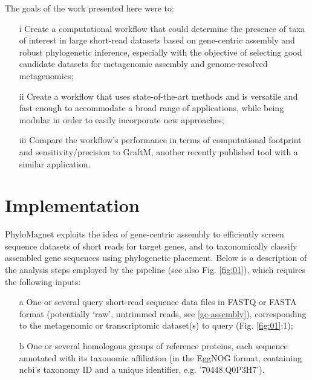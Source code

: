 \documentclass[a4paper]{article}
\begin{document}
The goals of the work presented here were to: 
\begin{enumerate}
\item[i] Create a computational workflow that could determine the presence of taxa of interest in large short-read datasets based on gene-centric assembly and robust phylogenetic inference, especially with the objective of selecting good candidate datasets for metagenomic assembly and genome-resolved metagenomics;
\item[ii] Create a workflow that uses state-of-the-art methods and is versatile and fast enough to accommodate a broad range of applications, while being modular in order to easily incorporate new approaches;
\item[iii] Compare the workflow’s performance in terms of computational footprint and sensitivity/precision to GraftM, another recently published tool with a similar application.
\end{enumerate}


\section{Implementation}\label{implementation}
PhyloMagnet exploits the idea of gene-centric assembly \citep{Huson2017} to efficiently screen sequence datasets  of short reads for target genes, and to taxonomically classify assembled gene sequences using phylogenetic placement. Below is a description of the analysis steps employed by the pipeline (see also Fig. \ref{fig:01}), which requires the following inputs: 
\begin{enumerate}

\item[a] One or several query short-read sequence data files in FASTQ or FASTA format (potentially ‘raw’, untrimmed reads, see \ref{gc-assembly}), corresponding to the metagenomic or transcriptomic dataset(s) to query (Fig. \ref{fig:01}:1);
\item[b] One or several homologous groups of reference proteins, each sequence annotated with its taxonomic affiliation (in the EggNOG format, containing ncbi’s taxonomy ID and a unique identifier, e.g. '70448.Q0P3H7').
\end{enumerate}
\end{document}
